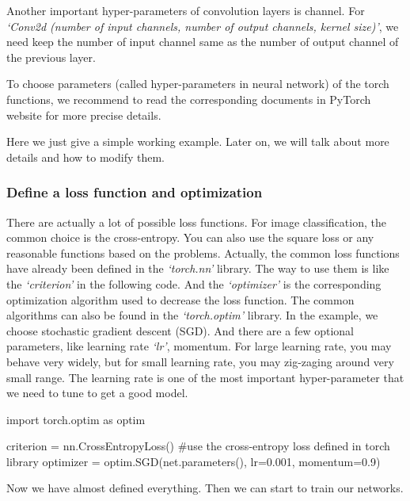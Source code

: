 Another important hyper-parameters of convolution layers is channel. For \emph{`Conv2d (number of input channels, number of output channels, kernel size)'}, we need keep the number of input channel same as the number of output channel of the previous layer.   

To choose parameters (called hyper-parameters in neural network) of the torch functions, we recommend to read the corresponding documents in PyTorch website for more precise details.

Here we just give a simple working example. Later on, we will talk about more details and how to modify them.

\subsubsection{Define a loss function and optimization}
There are actually a lot of possible loss functions. For image classification, the common choice is the cross-entropy. You can also use the square loss or any reasonable functions based on the problems. Actually, the common loss functions have already been defined in the \emph{`torch.nn'} library. The way to use them is like the \emph{`criterion'} in the following code. And the \emph{`optimizer'} is the corresponding optimization algorithm used to decrease the loss function. The common algorithms can also be found in the \emph{`torch.optim'} library. In the example, we choose stochastic gradient descent (SGD). And there are a few optional parameters, like learning rate \emph{`lr'}, momentum. For large learning rate, you may behave very widely, but for small learning rate, you may zig-zaging around very small range. The learning rate is one of the most important hyper-parameter that we need to tune to get a good model.
\begin{python}
import torch.optim as optim

criterion = nn.CrossEntropyLoss() #use the cross-entropy loss defined in torch library
optimizer = optim.SGD(net.parameters(), lr=0.001, momentum=0.9)
\end{python}     

Now we have almost defined everything. Then we can start to train our networks. 
